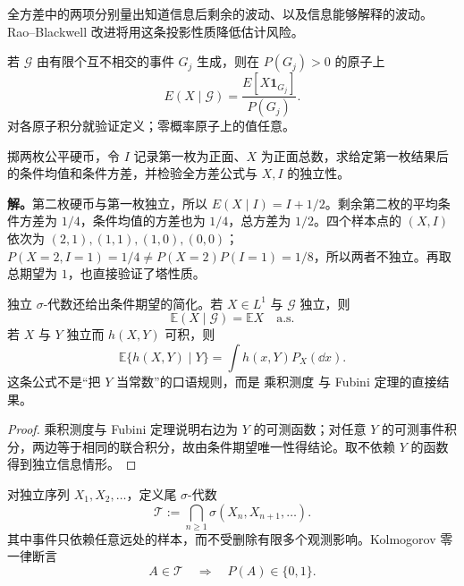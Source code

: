 全方差中的两项分别量出知道信息后剩余的波动、以及信息能够解释的波动。Rao--Blackwell 改进将用这条投影性质降低估计风险。

若 $\mathcal G$ 由有限个互不相交的事件 $G_j$ 生成，则在 $P(G_j)>0$ 的原子上
\[
 E(X\mid\mathcal G)=\frac{E[X\mathbf1_{G_j}]}{P(G_j)}.
\]
对各原子积分就验证定义；零概率原子上的值任意。

\begin{workedexample}[有限信息域上的条件平均]
掷两枚公平硬币，令 $I$ 记录第一枚为正面、$X$ 为正面总数，求给定第一枚结果后的条件均值和条件方差，并检验全方差公式与 $X,I$ 的独立性。

\textbf{解。}第二枚硬币与第一枚独立，所以 $E(X\mid I)=I+1/2$。剩余第二枚的平均条件方差为 $1/4$，条件均值的方差也为 $1/4$，总方差为 $1/2$。四个样本点的 $(X,I)$ 依次为 $(2,1),(1,1),(1,0),(0,0)$；$P(X=2,I=1)=1/4\ne P(X=2)P(I=1)=1/8$，所以两者不独立。再取总期望为 $1$，也直接验证了塔性质。
\end{workedexample}

\begin{proposition}[独立信息下的条件平均]
独立 $\sigma$-代数还给出条件期望的简化。若 $X\in L^1$ 与 $\mathcal G$ 独立，则
\begin{equation*}\mathbb E(X\mid\mathcal G)=\mathbb E X
\quad\text{a.s.}\end{equation*}
若 $X$ 与 $Y$ 独立而 $h(X,Y)$ 可积，则
\[
\mathbb E\{h(X,Y)\mid Y\}
=\int h(x,Y)P_X(\dd x).
\]
这条公式不是“把 $Y$ 当常数”的口语规则，而是 乘积测度 与 Fubini 定理的直接结果。

\end{proposition}
\begin{proof}
乘积测度与 Fubini 定理说明右边为 $Y$ 的可测函数；对任意 $Y$ 的可测事件积分，两边等于相同的联合积分，故由条件期望唯一性得结论。取不依赖 $Y$ 的函数得到独立信息情形。
\end{proof}

\begin{theorem}
对独立序列 $X_1,X_2,\ldots$，定义尾 $\sigma$-代数
\[
\mathcal T
:=\bigcap_{n\ge1}\sigma(X_n,X_{n+1},\ldots).
\]
其中事件只依赖任意远处的样本，而不受删除有限多个观测影响。Kolmogorov 零一律断言
\begin{equation*}A\in\mathcal T
\quad\Longrightarrow\quad
P(A)\in\{0,1\}.\end{equation*}

\end{theorem}

